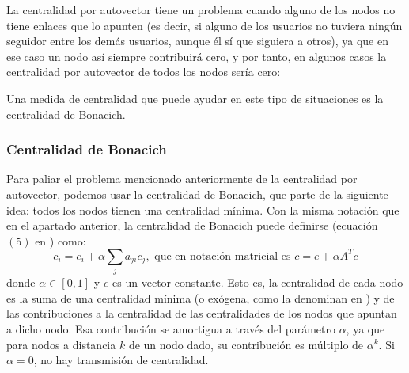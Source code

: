 La centralidad por autovector tiene un problema cuando
alguno de los nodos no tiene enlaces que lo apunten (es decir, si alguno de los usuarios
no tuviera ningún seguidor entre los demás usuarios, aunque él sí que siguiera a otros),
ya que en ese caso un nodo así siempre contribuirá cero, y por tanto, en algunos casos
la centralidad por autovector de todos los nodos sería cero:


Una medida de centralidad que puede ayudar en este tipo de situaciones es la 
centralidad de Bonacich.


\subsubsection{Centralidad de Bonacich}
Para paliar el problema mencionado anteriormente de la centralidad por 
autovector, podemos usar la centralidad de Bonacich, que  parte de la siguiente
idea: todos los nodos tienen una centralidad mínima. Con la misma notación que en el apartado
anterior, la centralidad de Bonacich puede definirse 
(ecuación $(5)$ en \cite{bonacich}) como:
$$c_i = e_i + \alpha\sum_j a_{ji} c_j, \mbox{ que en notación matricial es } c = e + \alpha A^Tc$$
donde $\alpha\in[0,1]$ y $e$ es un vector constante. Esto es, la centralidad de cada nodo es la suma
de una centralidad mínima (o exógena, como la denominan en \cite{bonacich}) 
y de las contribuciones a la centralidad de las centralidades de los nodos que apuntan 
a dicho nodo. Esa contribución se amortigua a través del parámetro $\alpha$, 
ya que para nodos a distancia $k$ de un nodo dado, su contribución es múltiplo de
$\alpha^k$. Si $\alpha=0$, no hay transmisión de centralidad.


